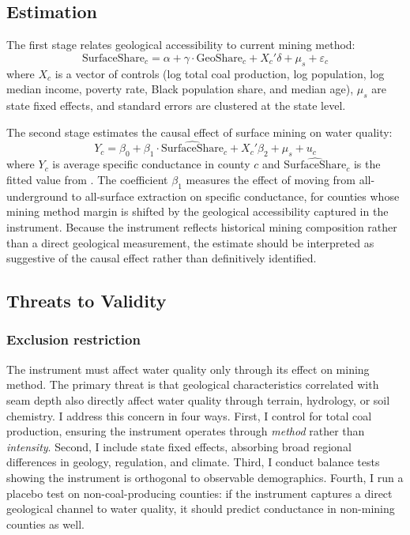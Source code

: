 \documentclass[12pt]{article}
\begin{document}
\subsection{Estimation}

The first stage relates geological accessibility to current mining method:
\begin{equation}
\text{SurfaceShare}_c = \alpha + \gamma \cdot \text{GeoShare}_c + X_c'\delta + \mu_s + \varepsilon_c
\label{eq:first_stage}
\end{equation}
where $X_c$ is a vector of controls (log total coal production, log population, log median income, poverty rate, Black population share, and median age), $\mu_s$ are state fixed effects, and standard errors are clustered at the state level.

The second stage estimates the causal effect of surface mining on water quality:
\begin{equation}
Y_c = \beta_0 + \beta_1 \cdot \widehat{\text{SurfaceShare}}_c + X_c'\beta_2 + \mu_s + u_c
\label{eq:second_stage}
\end{equation}
where $Y_c$ is average specific conductance in county $c$ and $\widehat{\text{SurfaceShare}}_c$ is the fitted value from . The coefficient $\beta_1$ measures the effect of moving from all-underground to all-surface extraction on specific conductance, for counties whose mining method margin is shifted by the geological accessibility captured in the instrument. Because the instrument reflects historical mining composition rather than a direct geological measurement, the estimate should be interpreted as suggestive of the causal effect rather than definitively identified.

\subsection{Threats to Validity}

\subsubsection*{Exclusion restriction} The instrument must affect water quality only through its effect on mining method. The primary threat is that geological characteristics correlated with seam depth also directly affect water quality through terrain, hydrology, or soil chemistry. I address this concern in four ways. First, I control for total coal production, ensuring the instrument operates through \textit{method} rather than \textit{intensity}. Second, I include state fixed effects, absorbing broad regional differences in geology, regulation, and climate. Third, I conduct balance tests showing the instrument is orthogonal to observable demographics. Fourth, I run a placebo test on non-coal-producing counties: if the instrument captures a direct geological channel to water quality, it should predict conductance in non-mining counties as well.
\end{document}
